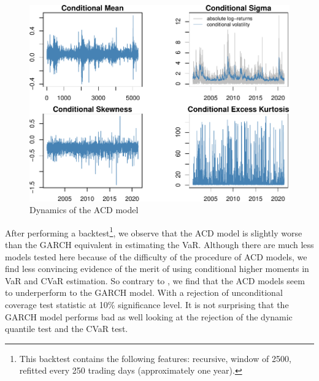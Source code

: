 \documentclass[a4paper, twoside]{templates/ociamthesis}
\begin{document}
\begin{figure}[h]

{\centering \includegraphics{_main_files/figure-latex/figureACDmoments-1} 

}

\caption{Dynamics of the ACD model}\label{fig:figureACDmoments}
\end{figure}

\newpage

\noindent After performing a backtest\footnote{This backtest contains the following features: recursive, window of 2500, refitted every 250 trading days (approximately one year).}, we observe that the ACD model is slightly worse than the GARCH equivalent in estimating the VaR. Although there are much less models tested here because of the difficulty of the procedure of ACD models, we find less convincing evidence of the merit of using conditional higher moments in VaR and CVaR estimation. So contrary to \textcite{bali2008}, we find that the ACD models seem to underperform to the GARCH model. With a rejection of unconditional coverage test statistic at 10\% significance level. It is not surprising that the GARCH model performs bad as well looking at the rejection of the dynamic quantile test and the CVaR test.

\newpage
\end{document}
